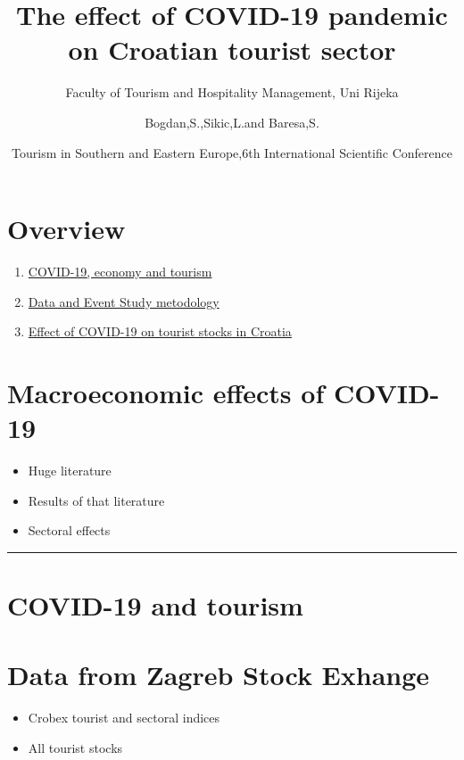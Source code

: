 \documentclass[
]{article}
\title{The effect of COVID-19 pandemic on Croatian tourist sector}
\subtitle{Faculty of Tourism and Hospitality Management, Uni Rijeka}
\author{Bogdan,S.,Sikic,L.and Baresa,S.}
\date{Tourism in Southern and Eastern Europe,6th International Scientific
Conference}
\providecommand{\tightlist}{%
  \setlength{\itemsep}{0pt}\setlength{\parskip}{0pt}}
\begin{document}
\maketitle

\hypertarget{overview}{%
\section{Overview}\label{overview}}

\begin{enumerate}
\def\labelenumi{\arabic{enumi}.}
\item
  \protect\hyperlink{econ}{COVID-19, economy and tourism}
\item
  \protect\hyperlink{dtamet}{Data and Event Study metodology}
\item
  \protect\hyperlink{effect}{Effect of COVID-19 on tourist stocks in
  Croatia}
\end{enumerate}

\hypertarget{macroeconomic-effects-of-covid-19}{%
\section{Macroeconomic effects of
COVID-19}\label{macroeconomic-effects-of-covid-19}}

\begin{itemize}
\tightlist
\item
  Huge literature 
\item
  Results of that literature 
\item
  Sectoral effects 
\end{itemize}

\begin{center}\rule{0.5\linewidth}{0.5pt}\end{center}

\hypertarget{covid-19-and-tourism}{%
\section{COVID-19 and tourism}\label{covid-19-and-tourism}}

\hypertarget{data-from-zagreb-stock-exhange}{%
\section{Data from Zagreb Stock
Exhange}\label{data-from-zagreb-stock-exhange}}

\begin{itemize}
\item
  Crobex tourist and sectoral indices
\item
  All tourist stocks
\end{itemize}
\end{document}
